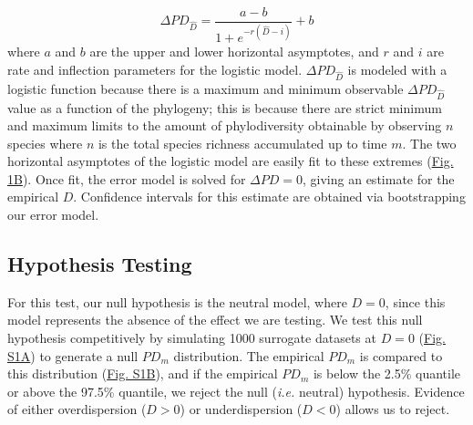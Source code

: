 \documentclass{article}
\begin{document}
\begin{equation}
	\label{sec:equation2}
	\Delta PD_{\hat{D}} = \frac {a-b} { 1 + e^{-r(\hat{D} -i)} } + b 
\end{equation}
where \(a\) and \(b\) are the upper and lower horizontal asymptotes, and \(r\) and \(i\) are rate and inflection parameters for the logistic model. \(\Delta PD_{\hat{D}}\) is modeled with a logistic function because there is a maximum and minimum observable \(\Delta PD_{\hat{D}}\) value as a function of the phylogeny; this is because there are strict minimum and maximum limits to the amount of phylodiversity obtainable by observing \(n\) species where \(n\) is the total species richness accumulated up to time \(m\). The two horizontal asymptotes of the logistic model are easily fit to these extremes (\hyperref[sec:figure1]{Fig. 1B}). Once fit, the error model is solved for \(\Delta PD=0\), giving an estimate for the empirical \(D\). Confidence intervals for this estimate are obtained via bootstrapping our error model.

\subsection{Hypothesis Testing} \label{sec:hypothesisTesting}
For this test, our null hypothesis is the neutral model, where \(D = 0\), since this model represents the absence of the effect we are testing. We test this null hypothesis competitively by simulating 1000 surrogate datasets at \(D = 0\) (\hyperref[sec:figureS1]{Fig. S1A}) to generate a null \(PD_m\) distribution. The empirical \(PD_m\) is compared to this distribution (\hyperref[sec:figureS1]{Fig. S1B}), and if the empirical \(PD_m\) is below the 2.5\% quantile or above the 97.5\% quantile, we reject the null (\emph{i.e.} neutral) hypothesis. Evidence of either overdispersion (\(D > 0\)) or underdispersion (\(D < 0\)) allows us to reject.
\end{document}
